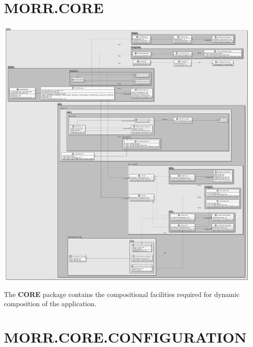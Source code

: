 \newpage
\section{MORR.CORE}

\begin{center}
    \includegraphics[width=1.0\textwidth]{resources/Packages/CORE.png}
\end{center}

The \textbf{CORE} package contains the compositional facilities required for dynamic composition of the application.

\begin{packif}
\end{packif}

\begin{packclass}
\end{packclass}

\begin{packpack}
\end{packpack}

\section*{MORR.CORE.CONFIGURATION}

